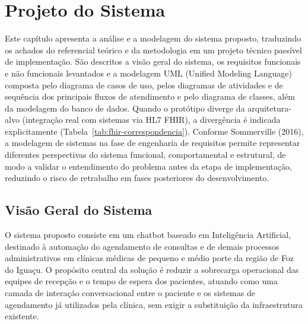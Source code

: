 \documentclass[12pt,a4paper]{extarticle}
\begin{document}
\newpage
\section{Projeto do Sistema}
\label{cap:projeto}

Este capítulo apresenta a análise e a modelagem do sistema proposto, traduzindo os achados do referencial teórico e da metodologia em um projeto técnico passível de implementação. São descritos a visão geral do sistema, os requisitos funcionais e não funcionais levantados e a modelagem UML (Unified Modeling Language) composta pelo diagrama de casos de uso, pelos diagramas de atividades e de sequência dos principais fluxos de atendimento e pelo diagrama de classes, além da modelagem do banco de dados. Quando o protótipo diverge da arquitetura-alvo (integração real com sistemas via HL7 FHIR), a divergência é indicada explicitamente (Tabela~\ref{tab:fhir-correspondencia}). Conforme Sommerville (2016), a modelagem de sistemas na fase de engenharia de requisitos permite representar diferentes perspectivas do sistema funcional, comportamental e estrutural, de modo a validar o entendimento do problema antes da etapa de implementação, reduzindo o risco de retrabalho em fases posteriores do desenvolvimento.

\subsection{Visão Geral do Sistema}

O sistema proposto consiste em um chatbot baseado em Inteligência Artificial, destinado à automação do agendamento de consultas e de demais processos administrativos em clínicas médicas de pequeno e médio porte da região de Foz do Iguaçu. O propósito central da solução é reduzir a sobrecarga operacional das equipes de recepção e o tempo de espera dos pacientes, atuando como uma camada de interação conversacional entre o paciente e os sistemas de agendamento já utilizados pela clínica, sem exigir a substituição da infraestrutura existente.
\end{document}
